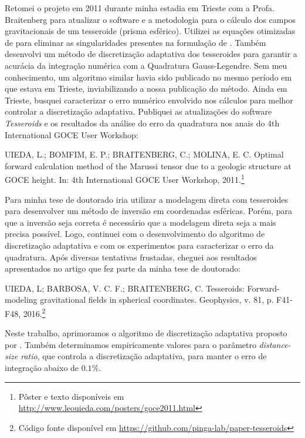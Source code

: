 \documentclass[12pt,a4paper,oneside,titlepage,onecolumn]{article}
\begin{document}
Retomei o projeto em 2011 durante minha estadia em Trieste com a Profa.
Braitenberg para atualizar o software e a metodologia para o cálculo dos campos
gravitacionais de um tesseroide (prisma esférico).
Utilizei as equações otimizadas de \citet{grombein2013} para eliminar
as singularidades presentes na formulação de \citet{wild-pfeiffer2008}.
Também desenvolvi um método de discretização adaptativa dos tesseroides para
garantir a acurácia da integração numérica com a Quadratura Gauss-Legendre.
Sem meu conhecimento, um algoritmo similar \citep{li2011} havia sido publicado
no mesmo período em que estava em Trieste, inviabilizando a nossa publicação do
método.
Ainda em Trieste, busquei caracterizar o erro numérico envolvido
nos cálculos para melhor controlar a discretização adaptativa.
Publiquei as atualizações do software \textit{Tesseroids} e os resultados da
análise do erro da quadratura nos anais do 4th International GOCE User
Workshop:

\begin{displayquote}
    UIEDA, L.; BOMFIM, E. P.; BRAITENBERG, C.; MOLINA, E. C. Optimal
    forward calculation method of the Marussi tensor due to a geologic
    structure at GOCE height. In: 4th International GOCE User Workshop,
    2011.\footnote{Pôster e texto disponíveis em
    \url{http://www.leouieda.com/posters/goce2011.html}}
\end{displayquote}

Para minha tese de doutorado iria utilizar a modelagem direta com tesseroides
para desenvolver um método de inversão em coordenadas esféricas.
Porém, para que a inversão seja correta é necessário que a modelagem direta
seja a mais precisa possível.
Logo, continuei com o desenvolvimento do algoritmo de discretização adaptativa
e com os experimentos para caracterizar o erro da quadratura.
Após diversas tentativas frustadas, cheguei aos resultados apresentados no
artigo que fez parte da minha tese de doutorado:

\begin{displayquote}
    UIEDA, L; BARBOSA, V. C. F.; BRAITENBERG, C. Tesseroids:
    Forward-modeling gravitational fields in spherical coordinates. Geophysics,
    v. 81, p. F41-F48, 2016.\footnote{Código fonte disponível em
    \url{https://github.com/pinga-lab/paper-tesseroids}}
\end{displayquote}

Neste trabalho, aprimoramos o algoritmo de discretização adaptativa proposto
por \citet{li2011}.
Também determinamos empiricamente valores para o parâmetro
\textit{distance-size ratio}, que controla a discretização adaptativa,
para manter o erro de integração abaixo de $0.1\%$.
\end{document}
